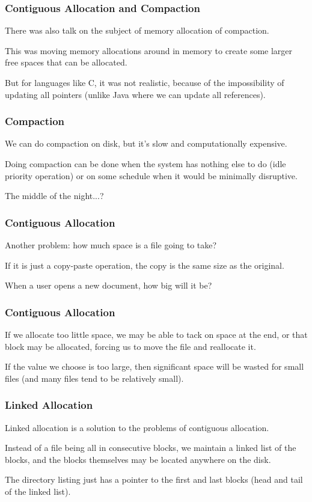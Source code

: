 \begin{frame}
\frametitle{Contiguous Allocation and Compaction}

There was also talk on the subject of memory allocation of compaction. 

This was moving memory allocations around in memory to create some larger free spaces that can be allocated. 

But for languages like C, it was not realistic, because of the impossibility of updating all pointers (unlike Java where we can update all references). 

\end{frame}

\begin{frame}
\frametitle{Compaction}

We can do compaction on disk, but it's slow and computationally expensive. 

Doing compaction can be done when the system has nothing else to do (idle priority operation) or on some schedule when it would be minimally disruptive.

The middle of the night...?


\end{frame}

\begin{frame}
\frametitle{Contiguous Allocation}

Another problem: how much space is a file going to take? 

If it is just a copy-paste operation, the copy is the same size as the original. 

When a user opens a new document, how big will it be? 

\end{frame}

\begin{frame}
\frametitle{Contiguous Allocation}


If we allocate too little space, we may be able to tack on space at the end, or that block may be allocated, forcing us to move the file and reallocate it. 

If the value we choose is too large, then significant space will be wasted for small files (and many files tend to be relatively small).

\end{frame}

\begin{frame}
\frametitle{Linked Allocation}

Linked allocation is a solution to the problems of contiguous allocation.

Instead of a file being all in consecutive blocks, we maintain a linked list of the blocks, and the blocks themselves may be located anywhere on the disk. 

The directory listing just has a pointer to the first and last blocks (head and tail of the linked list).

\end{frame}

